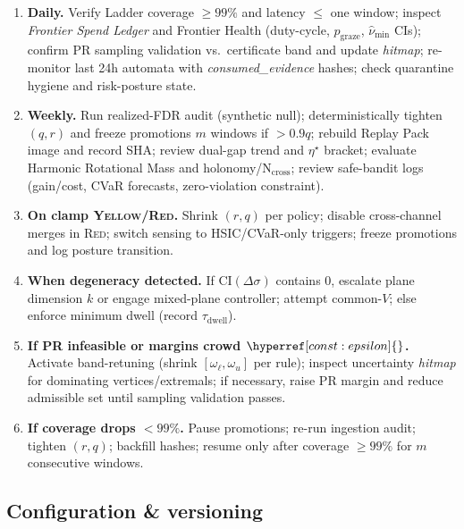 \documentclass[10pt]{article}
\newcommand{\cutq}{q}
\newcommand{\constref}[1]{\hyperref[const:#1]{\ensuremath{\csname constsym#1\endcsname}}}
\begin{document}
\begin{enumerate}[leftmargin=*]
\item \textbf{Daily.}
Verify Ladder coverage $\ge 99\%$ and latency $\le$ one window; inspect \emph{Frontier Spend Ledger} and Frontier Health (duty-cycle, $p_{\mathrm{graze}}$, $\hat\nu_{\min}$ CIs); confirm PR sampling validation vs.\ certificate band and update \emph{hitmap}; re-monitor last 24h automata with \emph{consumed\_evidence} hashes; check quarantine hygiene and risk-posture state.
\item \textbf{Weekly.}
Run realized-FDR audit (synthetic null); deterministically tighten $(\cutq,r)$ and freeze promotions $m$ windows if $>0.9\cutq$; rebuild Replay Pack image and record SHA; review dual-gap trend and $\eta^\star$ bracket; evaluate Harmonic Rotational Mass and holonomy/N$_{\mathrm{cross}}$; review safe-bandit logs (gain/cost, CVaR forecasts, zero-violation constraint).
\item \textbf{On clamp \textsc{Yellow/Red}.}
Shrink $(r,\cutq)$ per policy; disable cross-channel merges in \textsc{Red}; switch sensing to HSIC/CVaR-only triggers; freeze promotions and log posture transition.
\item \textbf{When degeneracy detected.}
If CI$(\Delta\sigma)$ contains $0$, escalate plane dimension $k$ or engage mixed-plane controller; attempt common-$V$; else enforce minimum dwell (record $\tau_{\mathrm{dwell}}$).
\item \textbf{If PR infeasible or margins crowd $\constref{epsilon}$.}
Activate band-retuning (shrink $[\omega_\ell,\omega_u]$ per rule); inspect uncertainty \emph{hitmap} for dominating vertices/extremals; if necessary, raise PR margin and reduce admissible set until sampling validation passes.
\item \textbf{If coverage drops $<99\%$.}
Pause promotions; re-run ingestion audit; tighten $(r,q)$; backfill hashes; resume only after coverage $\ge 99\%$ for $m$ consecutive windows.
\end{enumerate}

\subsection*{Configuration \& versioning}
\end{document}
